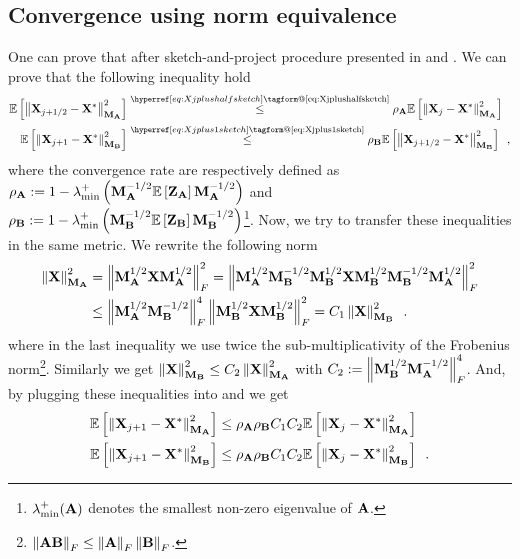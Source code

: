 \documentclass[10pt]{article}
\makeatletter
\renewcommand*{\eqref}[1]{%
  \hyperref[{#1}]{\textup{\tagform@{\ref*{#1}}}}%
}
\theoremstyle{definition}
\makeatother
\begin{document}
\subsection{Convergence using norm equivalence}

One can prove that after sketch-and-project procedure presented in \eqref{eq:Xjplushalfsketch} and \eqref{eq:Xjplus1sketch}. We can prove that the following inequality hold
\begin{align}
    \E{\norm{\mX_{j+1/2}-\mX^*}_{\mM_{\mA}}^2} &\overset{\eqref{eq:Xjplushalfsketch}}{\leq} \rho_{\mA} \E{\norm{\mX_{j}-\mX^*}_{\mM_{\mA}}^2} \label{eq:cv_rho_A}\\
    \E{\norm{\mX_{j+1}-\mX^*}_{\mM_{\mB}}^2} &\overset{\eqref{eq:Xjplus1sketch}}{\leq} \rho_{\mB} \E{\norm{\mX_{j+1/2}-\mX^*}_{\mM_{\mB}}^2} \label{eq:cv_rho_B} \enspace,
\end{align}
where the convergence rate are respectively defined as $\rho_{{\bf A}} := 1 - \lambda_{\min}^{+} \left({\bf M}_{{\bf A}}^{-1/2} \mathbb{E}\left[{\bf Z}_{{\bf A}}\right] {\bf M}_{{\bf A}}^{-1/2}\right)$ and $\rho_{{\bf B}} := 1 - \lambda_{\min}^{+} \left({\bf M}_{{\bf B}}^{-1/2} \mathbb{E}\left[{\bf Z}_{{\bf B}}\right] {\bf M}_{{\bf B}}^{-1/2}\right)$\footnote{$\lambda_{\min}^{+} ({\bf A})$ denotes the smallest non-zero eigenvalue of ${\bf A}$.}.
Now, we try to transfer these inequalities in the same metric. We rewrite the following norm
\begin{align*}
    \left\| {\bf X} \right\|_{{\bf M}_{{\bf A}}}^2 &= \left\| {\bf M}_{{\bf A}}^{1/2} {\bf X} {\bf M}_{{\bf A}}^{1/2} \right\|_{F}^2
    = \left\| {\bf M}_{{\bf A}}^{1/2} {\bf M}_{{\bf B}}^{-1/2} {\bf M}_{{\bf B}}^{1/2} {\bf X} {\bf M}_{{\bf B}}^{1/2} {\bf M}_{{\bf B}}^{-1/2} {\bf M}_{{\bf A}}^{1/2} \right\|_{F}^2 \\
    &\leq \left\| {\bf M}_{{\bf A}}^{1/2} {\bf M}_{{\bf B}}^{-1/2} \right\|_{F}^4 \left\| {\bf M}_{{\bf B}}^{1/2} {\bf X} {\bf M}_{{\bf B}}^{1/2} \right\|_{F}^2
    = C_1 \left\| {\bf X} \right\|_{{\bf M}_{{\bf B}}}^2 \enspace.
\end{align*}
where in the last inequality we use twice the sub-multiplicativity of the Frobenius norm\footnote{$\left\| {\bf A} {\bf B} \right\|_{F} \leq \left\| {\bf A} \right\|_{F} \left\| {\bf B} \right\|_{F}$.}. Similarly we get $\left\| {\bf X} \right\|_{{\bf M}_{{\bf B}}}^2 \leq C_2 \left\| {\bf X} \right\|_{{\bf M}_{{\bf A}}}^2$ with $C_2 := \left\| {\bf M}_{{\bf B}}^{1/2} {\bf M}_{{\bf A}}^{-1/2} \right\|_{F}^4$. And, by plugging these inequalities into \eqref{eq:cv_rho_A} and \eqref{eq:cv_rho_B} we get
\begin{align}
    \mathbb{E}\left[\left\| {\bf X}_{j+1}-{\bf X}^* \right\|_{{\bf M}_{{\bf A}}}^2\right] &\leq \rho_{{\bf A}} \rho_{{\bf B}} C_1 C_2 \mathbb{E}\left[\left\| {\bf X}_{j}-{\bf X}^* \right\|_{{\bf M}_{{\bf A}}}^2\right]\\
    \mathbb{E}\left[\left\| {\bf X}_{j+1}-{\bf X}^* \right\|_{{\bf M}_{{\bf B}}}^2\right] &\leq \rho_{{\bf A}} \rho_{{\bf B}} C_1 C_2 \mathbb{E}\left[\left\| {\bf X}_{j}-{\bf X}^* \right\|_{{\bf M}_{{\bf B}}}^2\right] \enspace.
\end{align}
\end{document}
